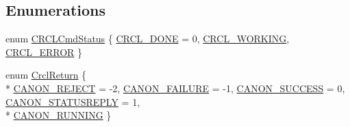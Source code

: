 \subsection*{Enumerations}
\begin{DoxyCompactItemize}
\item 
enum \hyperlink{namespaceCrcl_a5433cc9af1949d6f1305896f70a25eb2}{C\-R\-C\-L\-Cmd\-Status} \{ \hyperlink{namespaceCrcl_a5433cc9af1949d6f1305896f70a25eb2af072d9ec71f5cad174c9d48edc63cfda}{C\-R\-C\-L\-\_\-\-D\-O\-N\-E} = 0, 
\hyperlink{namespaceCrcl_a5433cc9af1949d6f1305896f70a25eb2a7917015bd7568bad9b62b9a544fcc6a7}{C\-R\-C\-L\-\_\-\-W\-O\-R\-K\-I\-N\-G}, 
\hyperlink{namespaceCrcl_a5433cc9af1949d6f1305896f70a25eb2a0e13ed6a4f24390d9e36dacec72abaa8}{C\-R\-C\-L\-\_\-\-E\-R\-R\-O\-R}
 \}
\item 
enum \hyperlink{namespaceCrcl_a1ed3b29723118a020251dde9b12733c0}{Crcl\-Return} \{ \\*
\hyperlink{namespaceCrcl_a1ed3b29723118a020251dde9b12733c0a8ba59e3e99680c229d1c20bc56aaf355}{C\-A\-N\-O\-N\-\_\-\-R\-E\-J\-E\-C\-T} = -\/2, 
\hyperlink{namespaceCrcl_a1ed3b29723118a020251dde9b12733c0abf41e0170807e238ca1716811f0a395e}{C\-A\-N\-O\-N\-\_\-\-F\-A\-I\-L\-U\-R\-E} = -\/1, 
\hyperlink{namespaceCrcl_a1ed3b29723118a020251dde9b12733c0af9001172ed075345641fbb95a818e0da}{C\-A\-N\-O\-N\-\_\-\-S\-U\-C\-C\-E\-S\-S} = 0, 
\hyperlink{namespaceCrcl_a1ed3b29723118a020251dde9b12733c0af8040d4fa18254e17c0e5b1893ba8859}{C\-A\-N\-O\-N\-\_\-\-S\-T\-A\-T\-U\-S\-R\-E\-P\-L\-Y} = 1, 
\\*
\hyperlink{namespaceCrcl_a1ed3b29723118a020251dde9b12733c0afdcee8c4e0e747aa30452b835fd1380a}{C\-A\-N\-O\-N\-\_\-\-R\-U\-N\-N\-I\-N\-G}
 \}
\end{DoxyCompactItemize}
